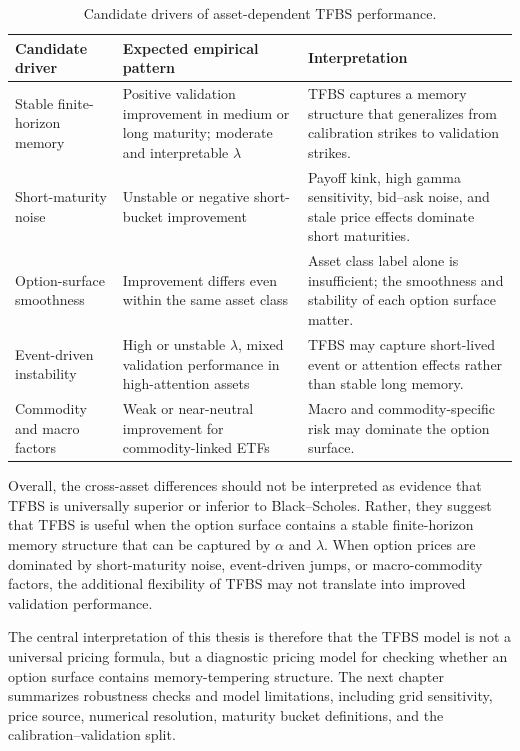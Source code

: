\documentclass[11pt,a4paper]{report}
\begin{document}
\begin{table}[htbp]
\centering
\small
\begin{tabular}{p{}p{}p{}}
\toprule
Candidate driver & Expected empirical pattern & Interpretation \\
\midrule
Stable finite-horizon memory
&
Positive validation improvement in medium or long maturity; moderate and interpretable $\lambda$
&
TFBS captures a memory structure that generalizes from calibration strikes to validation strikes.
\\
\midrule
Short-maturity noise
&
Unstable or negative short-bucket improvement
&
Payoff kink, high gamma sensitivity, bid--ask noise, and stale price effects dominate short maturities.
\\
\midrule
Option-surface smoothness
&
Improvement differs even within the same asset class
&
Asset class label alone is insufficient; the smoothness and stability of each option surface matter.
\\
\midrule
Event-driven instability
&
High or unstable $\lambda$, mixed validation performance in high-attention assets
&
TFBS may capture short-lived event or attention effects rather than stable long memory.
\\
\midrule
Commodity and macro factors
&
Weak or near-neutral improvement for commodity-linked ETFs
&
Macro and commodity-specific risk may dominate the option surface.
\\
\bottomrule
\end{tabular}
\caption{Candidate drivers of asset-dependent TFBS performance.}
\label{tab:candidate_drivers}
\end{table}

Overall, the cross-asset differences should not be interpreted as evidence that TFBS is universally superior or inferior to Black--Scholes. Rather, they suggest that TFBS is useful when the option surface contains a stable finite-horizon memory structure that can be captured by $\alpha$ and $\lambda$. When option prices are dominated by short-maturity noise, event-driven jumps, or macro-commodity factors, the additional flexibility of TFBS may not translate into improved validation performance.

The central interpretation of this thesis is therefore that the TFBS model is not a universal pricing formula, but a diagnostic pricing model for checking whether an option surface contains memory-tempering structure. The next chapter summarizes robustness checks and model limitations, including grid sensitivity, price source, numerical resolution, maturity bucket definitions, and the calibration--validation split.
\end{document}
